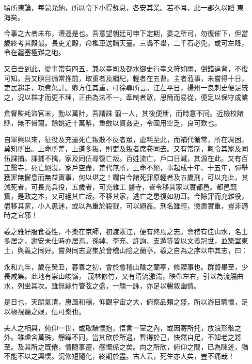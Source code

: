 \begin{pinyinscope}
 頃所陳論，每蒙允納，所以令下小得蘇息，各安其業。若不耳，此一郡久以蹈
 東海矣。



 今事之大者未布，漕運是也。吾意望朝廷可申下定期，委之所司，勿復催下，但當歲終考其殿最。長吏尤殿，命檻車送詣天臺。三縣不舉，二千石必免，或可左降，令在疆塞極難之地。



 又自吾到此，從事常有四五，兼以臺司及都水御史行臺文符如雨，倒錯違背，不復可知。吾又瞑目循常推前，取重者及綱紀，輕者在五曹。主者蒞事，未嘗得十日，吏民趨走，功費萬計。卿方任其重，可徐尋所言。江左平日，揚州一良刺史便足統之，況以群才而更不理，正由為法不一，牽制者眾，思簡而易從，便足以保守成業



 倉督監耗盜官米，動以萬計，吾謂誅
 翦一人，其後便斷，而時意不同。近檢校諸縣，無不皆爾。餘姚近十萬斛，重斂以資姦吏，令國用空乏，良可歎也。



 自軍興以來，征役及充運死亡叛散不反者眾，虛耗至此，而補代循常，所在凋困，莫知所出。上命所差，上道多叛，則吏及叛者席卷同去。又有常制，輒令其家及同伍課捕。課捕不擒，家及同伍尋復亡叛。百姓流亡，戶口日減，其源在此。又有百工醫寺，死亡絕沒，家戶空盡，差代無所，上命不絕，事起成十年、十五年，彈舉獲罪無懈息而無益實事，何以堪之！謂自今諸死罪原輕者及五歲刑，可以充此，其減死者，可長充兵役，五歲者，可充雜工
 醫寺，皆令移其家以實都邑。都邑既實，是政之本，又可絕其亡叛。不移其家，逃亡之患復如初耳。今除罪而充雜役，盡移其家，小人愚迷，或以為重於殺戮，可以絕姦。刑名雖輕，懲肅實重，豈非適時之宜邪！



 羲之雅好服食養性，不樂在京師，初渡浙江，便有終焉之志。會稽有佳山水，名士多居之，謝安未仕時亦居焉。孫綽、李充、許詢、支遁等皆以文義冠世，並築室東土，與羲之同好。嘗與同志宴集於會稽山陰之蘭亭，羲之自為之序以申其志，曰：



 永和九年，歲在癸丑，暮春之初，會於會稽山陰之蘭亭，修禊事也。群賢畢至，少長咸集。此地有崇山峻嶺，
 茂林修竹，又有清流激湍，映帶左右，引以為流觴曲水，列坐其次。雖無絲竹管弦之盛，一觴一詠，亦足以暢敘幽情。



 是日也，天朗氣清，惠風和暢，仰觀宇宙之大，俯察品類之盛，所以游目騁懷，足以極視聽之娛，信可樂也。



 夫人之相與，俯仰一世，或取諸懷抱，悟言一室之內，或因寄所托，放浪形骸之外。雖趣舍萬殊，靜躁不同，當其欣於所遇，暫得於己，快然自足，不知老之將至。及其所之既倦，情隨事遷，感慨係之矣。向之所欣，俯仰之間，已為陳迹，猶不能不以之興懷。況修短隨化，終期於盡。古人云，死生亦大矣，豈不痛哉！




\end{pinyinscope}
